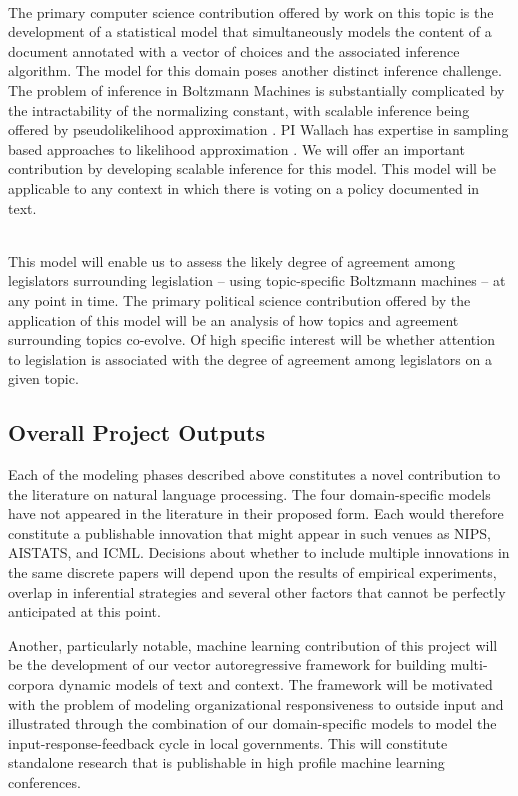 ~\\
 The primary computer
science contribution offered by work on this topic is the development
of a statistical model that simultaneously models the content of a
document annotated with a vector of choices and the associated inference algorithm. The model for this domain poses another distinct inference challenge. The problem of inference in Boltzmann Machines is substantially complicated by the intractability of the normalizing constant, with scalable inference being offered by pseudolikelihood approximation \cite{Hyvarinen2006}. PI Wallach has expertise in sampling based approaches to likelihood approximation \cite{Wallach2009}. We will offer an important contribution by developing scalable inference for this model. This model will be
applicable to any context in which there is voting on a policy
documented in text.

~\\
 This model will enable us to assess the likely degree of agreement among legislators surrounding legislation -- using topic-specific Boltzmann machines -- at any point in time. The primary political science contribution offered by the application of this model will be an analysis of how topics and agreement surrounding topics co-evolve. Of high specific interest will be whether attention to legislation is associated with the degree of agreement among legislators on a given topic.




\subsection{Overall Project Outputs}

Each of the modeling phases described above constitutes a novel contribution to the literature on natural language processing. The four domain-specific models have not appeared in the literature in their proposed form. Each would therefore constitute a publishable innovation that might appear in such venues as NIPS, AISTATS, and ICML. Decisions about whether to include multiple innovations in the same discrete papers will depend upon the results of empirical experiments, overlap in inferential strategies and several other factors that cannot be perfectly anticipated at this point.

Another, particularly notable, machine learning contribution of this project will be the development of our vector autoregressive framework for building multi-corpora dynamic models of text and context. The framework will be motivated with the problem of modeling organizational responsiveness to outside input and illustrated through the combination of our domain-specific models to model the input-response-feedback cycle in local governments. This will constitute standalone research that is publishable in high profile machine learning conferences.

